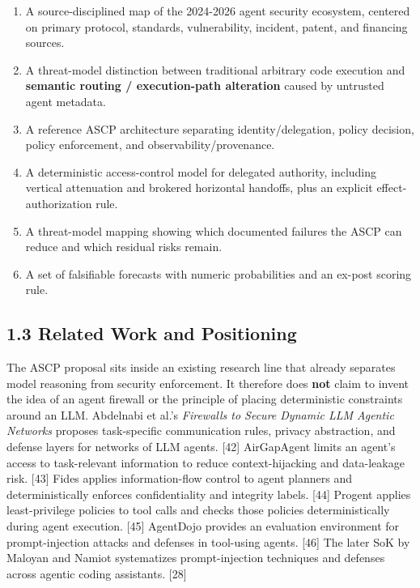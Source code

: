 \documentclass[
  10pt,
  letterpaper,
]{article}
\providecommand{\tightlist}{%
  \setlength{\itemsep}{0pt}\setlength{\parskip}{0pt}}
\begin{document}
\begin{enumerate}
\def\labelenumi{\arabic{enumi}.}
\tightlist
\item
  A source-disciplined map of the 2024-2026 agent security ecosystem,
  centered on primary protocol, standards, vulnerability, incident,
  patent, and financing sources.
\item
  A threat-model distinction between traditional arbitrary code
  execution and \textbf{semantic routing / execution-path alteration}
  caused by untrusted agent metadata.
\item
  A reference ASCP architecture separating identity/delegation, policy
  decision, policy enforcement, and observability/provenance.
\item
  A deterministic access-control model for delegated authority,
  including vertical attenuation and brokered horizontal handoffs, plus
  an explicit effect-authorization rule.
\item
  A threat-model mapping showing which documented failures the ASCP can
  reduce and which residual risks remain.
\item
  A set of falsifiable forecasts with numeric probabilities and an
  ex-post scoring rule.
\end{enumerate}

\subsection{1.3 Related Work and
Positioning}\label{related-work-and-positioning}

The ASCP proposal sits inside an existing research line that already
separates model reasoning from security enforcement. It therefore does
\textbf{not} claim to invent the idea of an agent firewall or the
principle of placing deterministic constraints around an LLM. Abdelnabi
et al.'s \emph{Firewalls to Secure Dynamic LLM Agentic Networks}
proposes task-specific communication rules, privacy abstraction, and
defense layers for networks of LLM agents. {[}42{]} AirGapAgent limits
an agent's access to task-relevant information to reduce
context-hijacking and data-leakage risk. {[}43{]} Fides applies
information-flow control to agent planners and deterministically
enforces confidentiality and integrity labels. {[}44{]} Progent applies
least-privilege policies to tool calls and checks those policies
deterministically during agent execution. {[}45{]} AgentDojo provides an
evaluation environment for prompt-injection attacks and defenses in
tool-using agents. {[}46{]} The later SoK by Maloyan and Namiot
systematizes prompt-injection techniques and defenses across agentic
coding assistants. {[}28{]}
\end{document}
